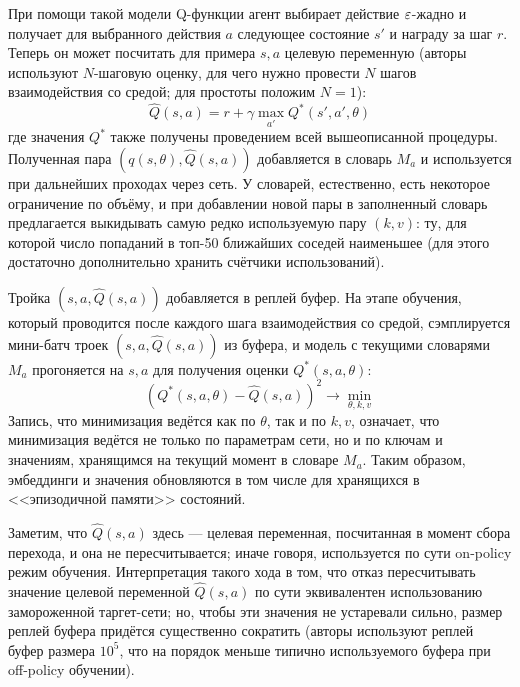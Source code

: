При помощи такой модели Q-функции агент выбирает действие $\varepsilon$-жадно и получает для выбранного действия $a$ следующее состояние $s'$ и награду за шаг $r$. Теперь он может посчитать для примера $s, a$ целевую переменную (авторы используют $N$-шаговую оценку, для чего нужно провести $N$ шагов взаимодействия со средой; для простоты положим $N=1$):
$$\hat{Q}(s, a) = r + \gamma \max_{a'} Q^*(s', a', \theta)$$
где значения $Q^*$ также получены проведением всей вышеописанной процедуры. Полученная пара $(q(s, \theta), \hat{Q}(s, a))$ добавляется в словарь $M_a$ и используется при дальнейших проходах через сеть. У словарей, естественно, есть некоторое ограничение по объёму, и при добавлении новой пары в заполненный словарь предлагается выкидывать самую редко используемую пару $(k, v)$: ту, для которой число попаданий в топ-50 ближайших соседей наименьшее (для этого достаточно дополнительно хранить счётчики использований).

Тройка $(s, a, \hat{Q}(s, a))$ добавляется в реплей буфер. На этапе обучения, который проводится после каждого шага взаимодействия со средой, сэмплируется мини-батч троек $(s, a, \hat{Q}(s, a))$ из буфера, и модель с текущими словарями $M_a$ прогоняется на $s, a$ для получения оценки $Q^*(s, a, \theta)$:
\begin{equation*}
\left( Q^*(s, a, \theta) - \hat{Q}(s, a)\right)^2 \to \min_{\theta, k, v}
\end{equation*}
Запись, что минимизация ведётся как по $\theta$, так и по $k, v$, означает, что минимизация ведётся не только по параметрам сети, но и по ключам и значениям, хранящимся на текущий момент в словаре $M_a$. Таким образом, эмбеддинги и значения обновляются в том числе для хранящихся в <<эпизодичной памяти>> состояний.

Заметим, что $\hat{Q}(s, a)$ здесь --- целевая переменная, посчитанная в момент сбора перехода, и она не пересчитывается; иначе говоря, используется по сути on-policy режим обучения. Интерпретация такого хода в том, что отказ пересчитывать значение целевой переменной $\hat{Q}(s, a)$ по сути эквивалентен использованию замороженной таргет-сети; но, чтобы эти значения не устаревали сильно, размер реплей буфера придётся существенно сократить (авторы используют реплей буфер размера $10^5$, что на порядок меньше типично используемого буфера при off-policy обучении).